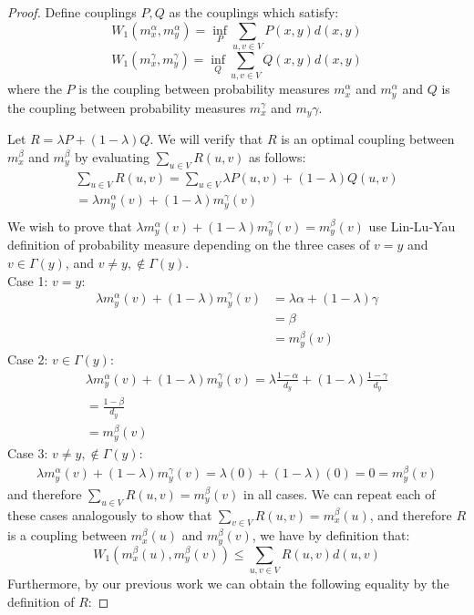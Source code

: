 \documentclass{Dissertate}
\theoremstyle{definition}
\theoremstyle{definition} %
\theoremstyle{definition}
\begin{document}
\begin{proof}
Define couplings $P, Q$ as the couplings which satisfy: 
$$
W_1(m_x^\alpha, m_y^\alpha) = \inf_{P} \sum_{u,v \in V} P(x,y) d(x,y)
$$
$$
W_1(m_x^\gamma, m_y^\gamma) = \inf_{Q} \sum_{u,v \in V} Q(x,y) d(x,y)
$$
where the $P$ is the coupling between probability measures $m_x^\alpha$ and $m_y^\alpha$ and $Q$ is the coupling between probability measures $m_x^\gamma$ and $m_y\gamma$. 

Let $R = \lambda P + (1- \lambda)Q$. We will verify that $R$ is an optimal coupling between $m_x^\beta$ and $m_y^\beta$ by evaluating $\sum_{u \in V} R(u,v)$ as follows: 
\begin{align*}
\sum_{u \in V} R(u, v) = \sum_{u \in V} \lambda P(u, v) + (1 - \lambda) Q(u, v) \\
= \lambda m_y^\alpha(v) + (1 - \lambda) m_y^\gamma(v) \\
\end{align*}
We wish to prove that $\lambda m_y^\alpha(v) + (1 - \lambda) m_y^\gamma(v) =  m_y^\beta(v)$ use Lin-Lu-Yau definition of probability measure depending on the three  cases of $v=y$ and $v \in \Gamma(y)$, and $v \neq y, \notin \Gamma(y)$. \\
Case 1: $v = y$:
\begin{align*}
\lambda m_y^\alpha(v) + (1 - \lambda) m_y^\gamma(v) &= \lambda \alpha + (1 - \lambda)\gamma \\
&= \beta \\
&= m_y^\beta(v)
\end{align*}
Case 2: $v \in \Gamma(y)$:
\begin{align*}
\lambda m_y^\alpha(v) + (1 - \lambda) m_y^\gamma(v) = \lambda \frac{1 - \alpha}{d_y} + (1 - \lambda)\frac{1 - \gamma}{d_y} \\
= \frac{1 - \beta}{d_y} \\
= m_y^\beta(v)
\end{align*}
Case 3: $v \neq y, \notin \Gamma(y)$:
\begin{align*}
\lambda m_y^\alpha(v) + (1 - \lambda) m_y^\gamma(v) = \lambda (0) + (1 - \lambda) (0) = 0 = m_y^\beta(v)
\end{align*}
and therefore $\sum_{u \in V} R(u, v) = m_y^\beta(v)$ in all cases. We can repeat each of these cases analogously to show that $\sum_{v \in V} R(u, v) = m_x^\beta(u)$, and therefore $R$ is a coupling between $m_x^\beta(u)$ and $m_y^\beta(v)$, we have by definition that: 
$$
W_1(m_x^\beta(u), m_y^\beta(v)) \leq \sum_{u, v \in V} R(u, v) d(u,v)
$$
Furthermore, by our previous work we can obtain the following equality by the definition of $R$: 

\end{proof}
\end{document}
